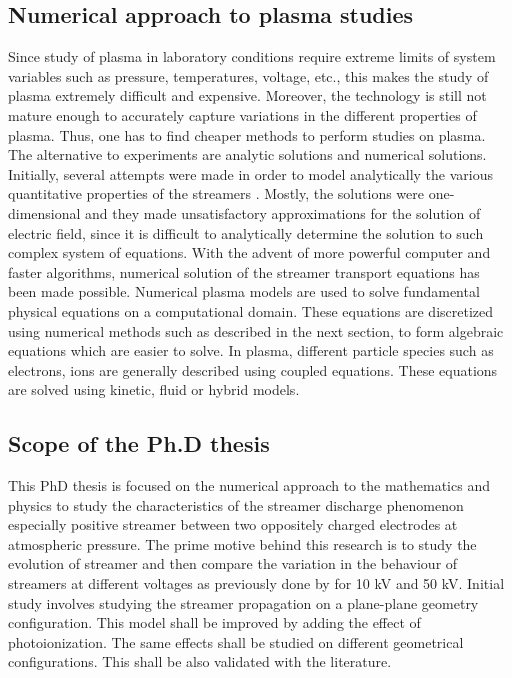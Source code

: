 \documentclass[paper=a4, fontsize=13pt]{scrartcl}
\begin{document}






\subsection{Numerical approach to plasma studies}


Since study of plasma in laboratory conditions require extreme limits of system variables such as pressure, temperatures, voltage, etc., this makes the study of plasma extremely difficult and expensive. Moreover, the technology is still not mature enough to accurately capture variations in the different properties of plasma. Thus, one has to find cheaper methods to perform studies on plasma. The alternative to experiments are analytic solutions and numerical solutions. Initially, several attempts were made in order to model analytically the various quantitative properties of the streamers \cite{Wright1964ASpark} \cite{Dawson1965APropagation} \cite{Albright1972IonizingStreamers}. Mostly, the solutions were one-dimensional and they made unsatisfactory approximations for the solution of electric field, since it is difficult to analytically determine the solution to such complex system of equations. With the advent of more powerful computer and faster algorithms, numerical solution of the streamer transport equations has been made possible. Numerical plasma models are used to solve fundamental physical equations on a computational domain. These equations are discretized using numerical methods such as described in the next section, to form algebraic equations which are easier to solve. In plasma, different particle species such as electrons, ions are generally described using coupled equations. These equations are solved using kinetic, fluid or hybrid models.     




\subsection{Scope of the Ph.D thesis}
This PhD thesis is focused on the numerical approach to the mathematics and physics to study the characteristics of the streamer discharge phenomenon especially positive streamer between two oppositely charged electrodes at atmospheric pressure. The prime motive behind this research is to study the evolution of streamer and then compare the variation in the behaviour of streamers at different voltages as previously done by \cite{Marode2009PhysicsEnvironment} for 10 kV and 50 kV. Initial study involves studying the streamer propagation on a plane-plane geometry configuration. This model shall be improved by adding the effect of photoionization. The same effects shall be studied on different geometrical configurations. This shall be also validated with the literature.  
\end{document}
